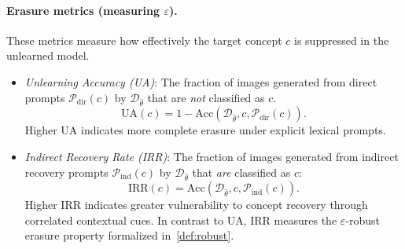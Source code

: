 \paragraph{Erasure metrics (measuring $\varepsilon$).}
These metrics measure how effectively the target concept $c$ is suppressed in the unlearned model.
\begin{itemize}
    \item \emph{Unlearning Accuracy (UA)}: The fraction of images generated from direct prompts $\mathcal{P}_{\mathrm{dir}}(c)$ by $\mathcal{D}_{\hat\theta}$ that 
    are \emph{not} classified as $c$. 
    \begin{equation}
    \label{eq:ua}
    \mathrm{UA}(c) = 1 - \mathrm{Acc}(\mathcal{D}_{\hat\theta}, c, \mathcal{P}_{\mathrm{dir}}(c)).
    \end{equation}
    Higher UA indicates more complete erasure under explicit lexical prompts.
    \item \emph{Indirect Recovery Rate (IRR)}: The fraction of images generated from indirect recovery prompts $\mathcal{P}_{\mathrm{ind}}(c)$ by 
    $\mathcal{D}_{\hat\theta}$ that \emph{are} classified as $c$: 
    \begin{equation}
    \label{eq:irr}
    \mathrm{IRR}(c) = \mathrm{Acc}(\mathcal{D}_{\hat\theta}, c, \mathcal{P}_{\mathrm{ind}}(c)).
    \end{equation}
    Higher IRR indicates greater vulnerability to concept recovery through correlated contextual cues. In contrast to UA, IRR measures the $\varepsilon$-robust erasure property formalized in~\cref{def:robust}.
\end{itemize}

